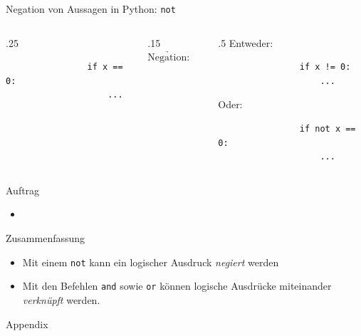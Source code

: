 \begin{frame}[fragile]{Negation von Aussagen in Python: \lstinline|not|}
    \begin{columns}
        \begin{column}{.25\textwidth}
            \begin{lstlisting}
                if x == 0:
                    ...
            \end{lstlisting}
        \end{column}
        \begin{column}{.15\textwidth}
            $\underrightarrow{\text{Negation:}}$
        \end{column}
        \begin{column}{.5\textwidth}
            Entweder:
            \begin{lstlisting}
                if x != 0:
                    ...
            \end{lstlisting}
            
            Oder:
            \begin{lstlisting}
                if not x == 0:
                    ...
            \end{lstlisting}
        \end{column}
    \end{columns}
\end{frame}

\begin{frame}[fragile]{Auftrag}
    \begin{itemize}
        \item {}
    \end{itemize}
\end{frame}

\begin{frame}[fragile]{Zusammenfassung}
    \begin{itemize}
        \item Mit einem \lstinline|not| kann ein logischer Ausdruck \textit{negiert} werden
        \item Mit den Befehlen \lstinline|and| sowie \lstinline|or| können logische Ausdrücke miteinander \textit{verknüpft} werden.
    \end{itemize}
\end{frame}



\appendix
\begin{frame}[plain]
    \centering
    \Huge Appendix
\end{frame}


